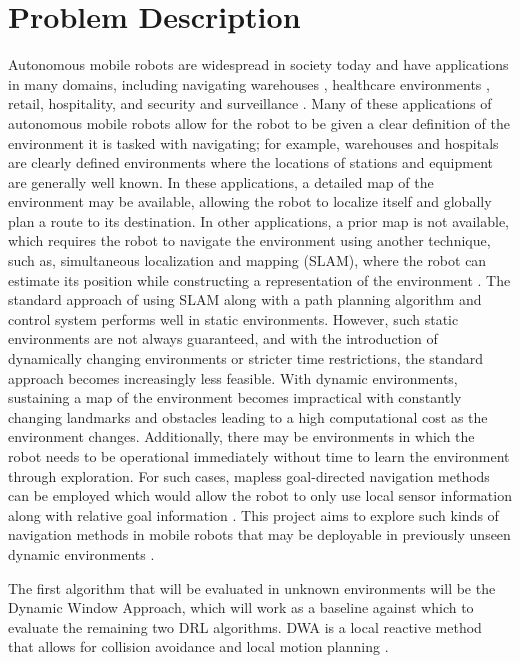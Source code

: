 \documentclass[conference]{IEEEtran}
\begin{document}
\section{Problem Description}
Autonomous mobile robots are widespread in society today and have applications in many domains, including navigating warehouses \cite{keith2024reviewautonomousmobilerobots}, healthcare environments \cite{electronics12234791}, retail, hospitality, and security and surveillance \cite{cognominal2021evolving}.
Many of these applications of autonomous mobile robots allow for the robot to be given a clear definition of the environment it is tasked with navigating; for example, warehouses and hospitals are clearly defined environments where the locations of stations and equipment are generally well known.
In these applications, a detailed map of the environment may be available, allowing the robot to localize itself and globally plan a route to its destination. 
In other applications, a prior map is not available, which requires the robot to navigate the environment using another technique, such as, simultaneous localization and mapping (SLAM), where the robot can estimate its position while constructing a representation of the environment \cite{Durrant_Bailey} \cite{Loganathan}.
The standard approach of using SLAM along with a path planning algorithm and control system performs well in static environments.
However, such static environments are not always guaranteed, and with the introduction of dynamically changing environments or stricter time restrictions, the standard approach becomes increasingly less feasible. 
With dynamic environments, sustaining a map of the environment becomes impractical with constantly changing landmarks and obstacles leading to a high computational cost as the environment changes.
Additionally, there may be environments in which the robot needs to be operational immediately without time to learn the environment through exploration. 
For such cases, mapless goal-directed navigation methods can be employed which would allow the robot to only use local sensor information along with relative goal information \cite{Dobrevski_Skočaj_2021}.
This project aims to explore such kinds of navigation methods in mobile robots that may be deployable in previously unseen dynamic environments \cite{Tai_Lei}.
\par
The first algorithm that will be evaluated in unknown environments will be the Dynamic Window Approach, which will work as a baseline against which to evaluate the remaining two DRL algorithms.
DWA is a local reactive method that allows for collision avoidance and local motion planning \cite{Fox_Burgand}.
\end{document}
